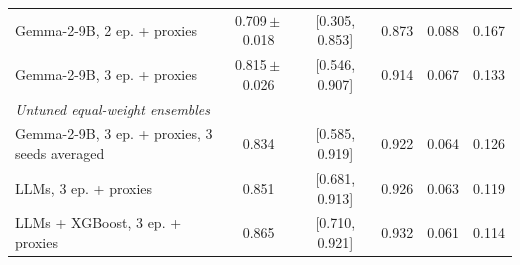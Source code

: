 \begin{table}[t]
{\begin{tabular}{lccccc}
\quad Gemma-2-9B, 2 ep. + proxies & 0.709\,$\pm$\,0.018 & [0.305, 0.853] & 0.873 & 0.088 & 0.167 \\
\quad Gemma-2-9B, 3 ep. + proxies & 0.815\,$\pm$\,0.026 & [0.546, 0.907] & 0.914 & 0.067 & 0.133 \\
\midrule
\multicolumn{6}{l}{\textit{Untuned equal-weight ensembles}} \\
\quad Gemma-2-9B, 3 ep. + proxies, 3 seeds averaged & 0.834 & [0.585, 0.919] & 0.922 & 0.064 & 0.126 \\
\quad 3 LLMs, 3 ep. + proxies & 0.851 & [0.681, 0.913] & 0.926 & 0.063 & 0.119 \\
\quad 3 LLMs + XGBoost, 3 ep. + proxies & 0.865 & [0.710, 0.921] & 0.932 & 0.061 & 0.114 \\
\bottomrule
\end{tabular}
}
\end{table}
